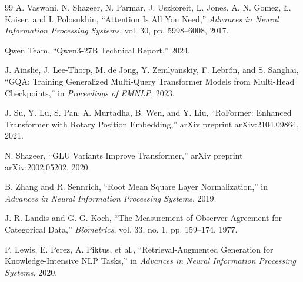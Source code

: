 \documentclass[12pt,a4paper,openany]{report}
\begin{document}
\begin{thebibliography}{99}
 A. Vaswani, N. Shazeer, N. Parmar, J. Uszkoreit, L. Jones, A. N. Gomez, \L. Kaiser, and I. Polosukhin, ``Attention Is All You Need,'' \textit{Advances in Neural Information Processing Systems}, vol. 30, pp. 5998--6008, 2017.

 Qwen Team, ``Qwen3-27B Technical Report,'' 2024.

 J. Ainslie, J. Lee-Thorp, M. de Jong, Y. Zemlyanskiy, F. Lebr\'{o}n, and S. Sanghai, ``GQA: Training Generalized Multi-Query Transformer Models from Multi-Head Checkpoints,'' in \textit{Proceedings of EMNLP}, 2023.

 J. Su, Y. Lu, S. Pan, A. Murtadha, B. Wen, and Y. Liu, ``RoFormer: Enhanced Transformer with Rotary Position Embedding,'' arXiv preprint arXiv:2104.09864, 2021.

 N. Shazeer, ``GLU Variants Improve Transformer,'' arXiv preprint arXiv:2002.05202, 2020.

 B. Zhang and R. Sennrich, ``Root Mean Square Layer Normalization,'' in \textit{Advances in Neural Information Processing Systems}, 2019.

 J. R. Landis and G. G. Koch, ``The Measurement of Observer Agreement for Categorical Data,'' \textit{Biometrics}, vol. 33, no. 1, pp. 159--174, 1977.

 P. Lewis, E. Perez, A. Piktus, et al., ``Retrieval-Augmented Generation for Knowledge-Intensive NLP Tasks,'' in \textit{Advances in Neural Information Processing Systems}, 2020.

\end{thebibliography}
\end{document}
